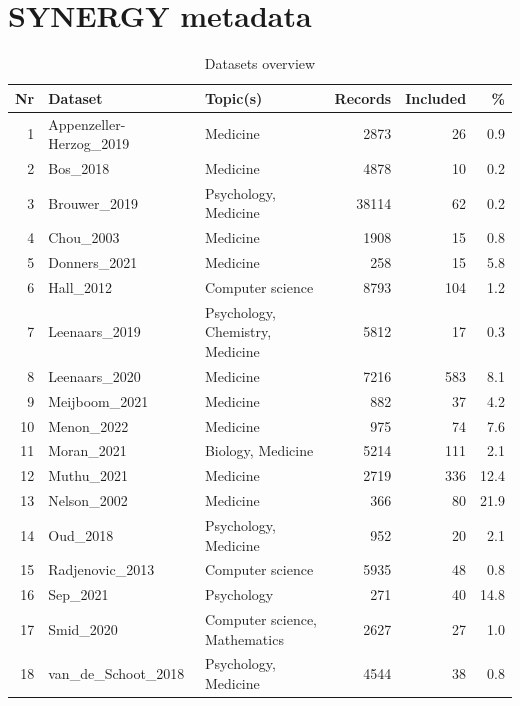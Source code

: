 \documentclass[12pt]{article}
\begin{document}
\appendix

\section{SYNERGY metadata}

\begin{table}[ht]
\centering
\caption{Datasets overview}
\begin{tabularx}{\textwidth}{@{}r l X r r r@{}}
\toprule
\textbf{Nr} & \textbf{Dataset} & \textbf{Topic(s)} & \textbf{Records} & \textbf{Included} & \textbf{\%} \\
\midrule
1  & Appenzeller-Herzog\_2019 & Medicine & 2873  & 26  & 0.9 \\
2  & Bos\_2018                 & Medicine & 4878  & 10  & 0.2 \\
3  & Brouwer\_2019             & Psychology, Medicine & 38114 & 62  & 0.2 \\
4  & Chou\_2003                & Medicine & 1908  & 15  & 0.8 \\
5  & Donners\_2021             & Medicine & 258   & 15  & 5.8 \\
6  & Hall\_2012                & Computer science & 8793  & 104 & 1.2 \\
7  & Leenaars\_2019            & Psychology, Chemistry, Medicine & 5812  & 17  & 0.3 \\
8  & Leenaars\_2020            & Medicine & 7216  & 583 & 8.1 \\
9  & Meijboom\_2021            & Medicine & 882   & 37  & 4.2 \\
10 & Menon\_2022               & Medicine & 975   & 74  & 7.6 \\
11 & Moran\_2021               & Biology, Medicine & 5214  & 111 & 2.1 \\
12 & Muthu\_2021               & Medicine & 2719  & 336 & 12.4 \\
13 & Nelson\_2002              & Medicine & 366   & 80  & 21.9 \\
14 & Oud\_2018                 & Psychology, Medicine & 952   & 20  & 2.1 \\
15 & Radjenovic\_2013          & Computer science & 5935  & 48  & 0.8 \\
16 & Sep\_2021                 & Psychology & 271   & 40  & 14.8 \\
17 & Smid\_2020                & Computer science, Mathematics & 2627  & 27  & 1.0 \\
18 & van\_de\_Schoot\_2018     & Psychology, Medicine & 4544  & 38  & 0.8 \\

\end{tabularx}
\end{table}
\end{document}
